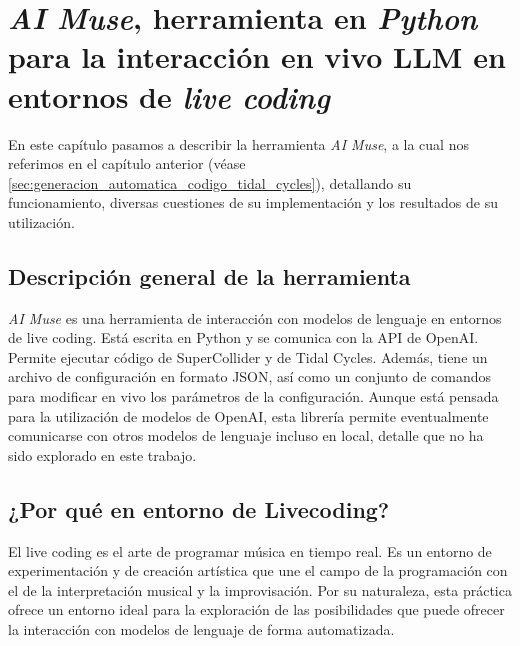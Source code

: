 \chapter{\emph{AI Muse}, herramienta en \emph{Python} para la interacción en vivo LLM en entornos de \emph{live coding}}
\label{chap:ai_muse}


En este capítulo pasamos a describir la herramienta \emph{AI Muse}, a la cual nos referimos en el capítulo anterior (véase \ref{sec:generacion_automatica_codigo_tidal_cycles}), detallando su funcionamiento, diversas cuestiones de su implementación y los resultados de su utilización.

\section{Descripción general de la herramienta}

\emph{AI Muse} es una herramienta de interacción con modelos de lenguaje en entornos de live coding. Está escrita en Python y se comunica con la API de OpenAI. Permite ejecutar código de SuperCollider y de Tidal Cycles. Además, tiene un archivo de configuración en formato JSON, así como un conjunto de comandos para modificar en vivo los parámetros de la configuración. Aunque está pensada para la utilización de modelos de OpenAI, esta librería permite eventualmente comunicarse con otros modelos de lenguaje incluso en local, detalle que no ha sido explorado en este trabajo.


\section{¿Por qué en entorno de Livecoding?}

El live coding es el arte de programar música en tiempo real. Es un entorno de experimentación y de creación artística que une el campo de la programación con el de la interpretación musical y la improvisación. Por su naturaleza, esta práctica ofrece un entorno ideal para la exploración de las posibilidades que puede ofrecer la interacción con modelos de lenguaje de forma automatizada. 

